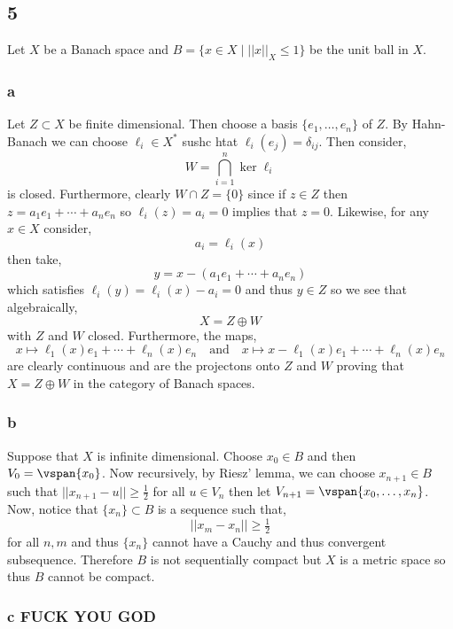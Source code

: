 \documentclass[12pt]{article}
\begin{document}
\subsection{5} 

Let $X$ be a Banach space and $B = \{ x \in X \mid || x ||_X \le 1 \}$ be the unit ball in $X$. 

\subsubsection{a}

Let $Z \subset X$ be finite dimensional. Then choose a basis $\{ e_1, \dots, e_n \}$ of $Z$. By Hahn-Banach we can choose $\ell_i \in X^*$ sushc htat $\ell_i(e_j) = \delta_{ij}$. Then consider, \[ W = \bigcap_{i = 1}^n \ker{\ell_i} \]
is closed. Furthermore, clearly $W \cap Z = \{ 0 \}$ since if $z \in Z$ then $z = a_1 e_1 + \cdots + a_n e_n$ so $\ell_i(z) = a_i = 0$ implies that $z = 0$. Likewise, for any $x \in X$ consider,
\[ a_i = \ell_i(x) \]
then take,
\[ y = x - (a_1 e_1 + \cdots + a_n e_n) \]
which satisfies $\ell_i(y) = \ell_i(x) - a_i = 0$ and thus $y \in Z$ so we see that algebraically,
\[ X = Z \oplus W \]
with $Z$ and $W$ closed. Furthermore, the maps, 
\[ x \mapsto \ell_1(x) e_1 + \cdots + \ell_n(x) e_n \quad \text{and} \quad x \mapsto x - \ell_1(x) e_1 + \cdots + \ell_n(x) e_n \]
are clearly continuous and are the projectons onto $Z$ and $W$ proving that $X = Z \oplus W$ in the category of Banach spaces.

\subsubsection{b}

Suppose that $X$ is infinite dimensional. Choose $x_0 \in B$ and then $V_0 = \vspan{x_0}$. Now recursively, by Riesz' lemma, we can choose $x_{n+1} \in B$ such that $|| x_{n + 1} - u || \ge \tfrac{1}{2}$ for all $u \in V_n$ then let $V_{n+1} = \vspan{x_0, \dots, x_n}$. Now, notice that $\{ x_n \} \subset B$ is a sequence such that,
\[ || x_{m} - x_n || \ge \tfrac{1}{2} \]
for all $n,m$ and thus $\{ x_n \}$ cannot have a Cauchy and thus convergent subsequence. Therefore $B$ is not sequentially compact but $X$ is a metric space so thus $B$ cannot be compact.

\subsubsection{c FUCK YOU GOD}
\end{document}
